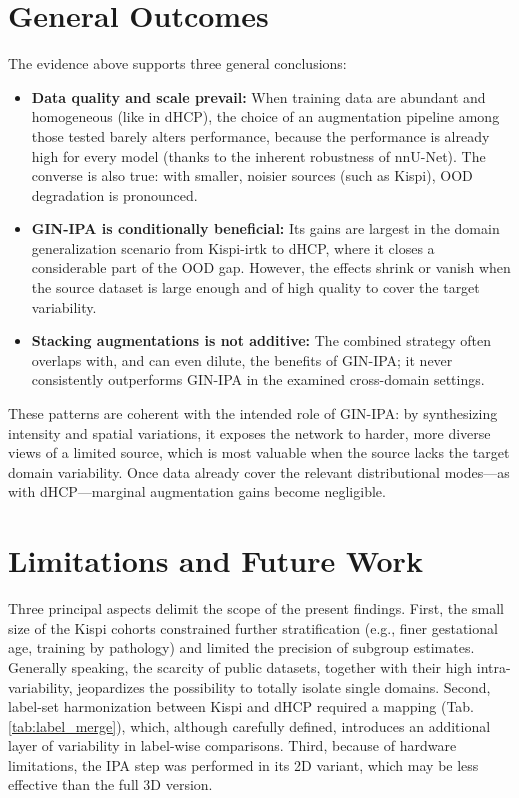 \section{General Outcomes}
The evidence above supports three general conclusions:
\begin{itemize}
    \item \textbf{Data quality and scale prevail:} When training data are abundant and homogeneous (like in dHCP), the choice of an augmentation pipeline among those tested barely alters performance, because the performance is already high for every model (thanks to the inherent robustness of nnU-Net). The converse is also true: with smaller, noisier sources (such as Kispi), OOD degradation is pronounced.
    \item \textbf{GIN-IPA is conditionally beneficial:} Its gains are largest in the domain generalization scenario from Kispi-irtk to dHCP, where it closes a considerable part of the OOD gap. However, the effects shrink or vanish when the source dataset is large enough and of high quality to cover the target variability.
    \item \textbf{Stacking augmentations is not additive:} The combined strategy often overlaps with, and can even dilute, the benefits of GIN-IPA; it never consistently outperforms GIN-IPA in the examined cross-domain settings.
\end{itemize}

These patterns are coherent with the intended role of GIN-IPA: by synthesizing intensity and spatial variations, it exposes the network to harder, more diverse views of a limited source, which is most valuable when the source lacks the target domain variability. Once data already cover the relevant distributional modes---as with dHCP---marginal augmentation gains become negligible.

\section{Limitations and Future Work}
Three principal aspects delimit the scope of the present findings. First, the small size of the Kispi cohorts constrained further stratification (e.g., finer gestational age, training by pathology) and limited the precision of subgroup estimates. Generally speaking, the scarcity of public datasets, together with their high intra-variability, jeopardizes the possibility to totally isolate single domains. Second, label-set harmonization between Kispi and dHCP required a mapping (Tab.\,\ref{tab:label_merge}), which, although carefully defined, introduces an additional layer of variability in label-wise comparisons. Third, because of hardware limitations, the IPA step was performed in its 2D variant, which may be less effective than the full 3D version.

